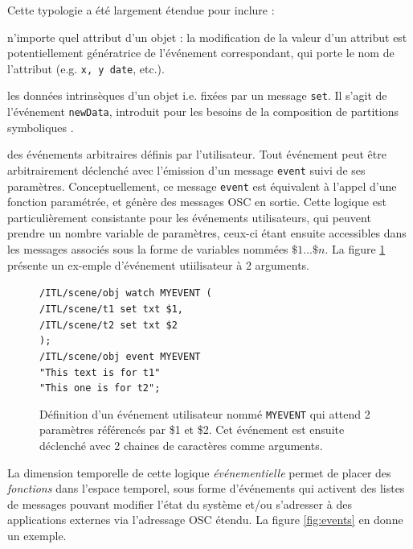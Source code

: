 \documentclass{article}
\newcommand{\OSC}[1]	{{\fontsize{9pt}{9pt} \selectfont\texttt{#1}}}
\newcommand{\tab}{\hspace*{4mm}}
\let\olditemize\itemize
\let\oldenditemize\enditemize
\renewenvironment{itemize} 	{\olditemize \renewcommand{\labelitemi}{$\bullet$} \setlength{\itemsep}{0mm}}{\oldenditemize}
\newcommand{\sample}[1]		{\vspace{-0.2em}\begin{center}\colorbox{mygrey}{\begin{minipage}[t]{0.98\columnwidth} {\small \texttt{#1}}\end{minipage}}\end{center}}
\begin{document}
Cette typologie a été largement étendue pour inclure :
\begin{itemize}
\item n'importe quel attribut d'un objet : la modification de la valeur d'un attribut est potentiellement génératrice de l'événement correspondant, qui porte le nom de l'attribut (e.g. \OSC{x, y date}, etc.). 
\item les données intrinsèques d'un objet i.e. fixées par un message \OSC{set}. Il s'agit de l'événement \OSC{newData}, introduit pour les besoins de la composition de partitions symboliques \cite{lepetit16}.
\item des événements arbitraires définis par l'utilisateur.
\end{itemize}
\vspace*{1mm}
Tout événement peut être arbitrairement déclenché avec l'émission d'un message \OSC{event} suivi de ses paramètres. Conceptuellement, ce message \OSC{event} est équivalent à l'appel d'une fonction paramétrée, et génère des messages OSC en sortie. 
Cette logique est particulièrement consistante pour les événements utilisateurs, qui peuvent prendre un nombre variable de paramètres, ceux-ci étant ensuite accessibles dans les messages associés sous la forme de variables nommées $\$1...\$n$. La figure \ref{fig:uevent} présente un ex-emple d'événement utiilisateur à 2 arguments.

\begin{figure}[h]
   \centering
   \sample{/ITL/scene/obj watch MYEVENT ( \\
\tab/ITL/scene/t1 set txt \$1, \\
\tab/ITL/scene/t2 set txt \$2 \\
);   \\   
/ITL/scene/obj event MYEVENT \\
\hspace*{25mm}"This text is for t1"\\
\hspace*{25mm}"This one is for t2"; 
}
   \caption{Définition d'un événement utilisateur nommé \OSC{MYEVENT} qui attend 2 paramètres référencés par \$1 et \$2. Cet événement est ensuite déclenché avec 2 chaines de caractères comme arguments.}
   \label{fig:uevent}
\end{figure}


La dimension temporelle de cette logique \emph{événementielle} permet de placer des \emph{fonctions} dans l'espace temporel, sous forme d'événements qui activent des listes de messages pouvant modifier l'état du système et/ou s'adresser à des applications externes via l'adressage OSC étendu. La figure \ref{fig:events} en donne un exemple.
  
\end{document}
